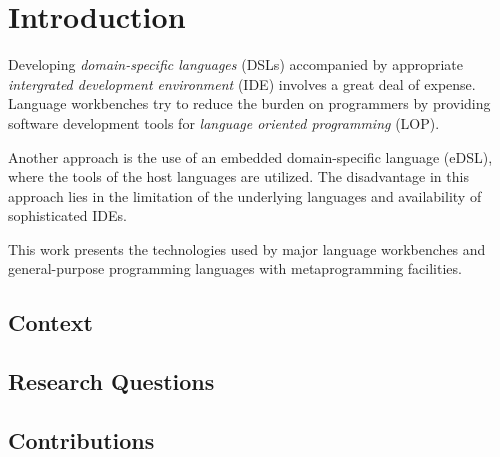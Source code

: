 \chapter{Introduction}

Developing \textit{domain-specific languages} (DSLs) accompanied by appropriate \textit{intergrated development environment} (IDE) involves a great deal of expense.
Language workbenches try to reduce the burden on programmers by providing software development tools for \textit{language oriented programming} (LOP).

Another approach is the use of an embedded domain-specific language (eDSL), where the tools of the host languages are utilized.
The disadvantage in this approach lies in the limitation of the underlying languages and availability of sophisticated IDEs.

This work presents the technologies used by major language workbenches and general-purpose programming languages with metaprogramming facilities.

\section{Context}

\section{Research Questions}

\section{Contributions}
